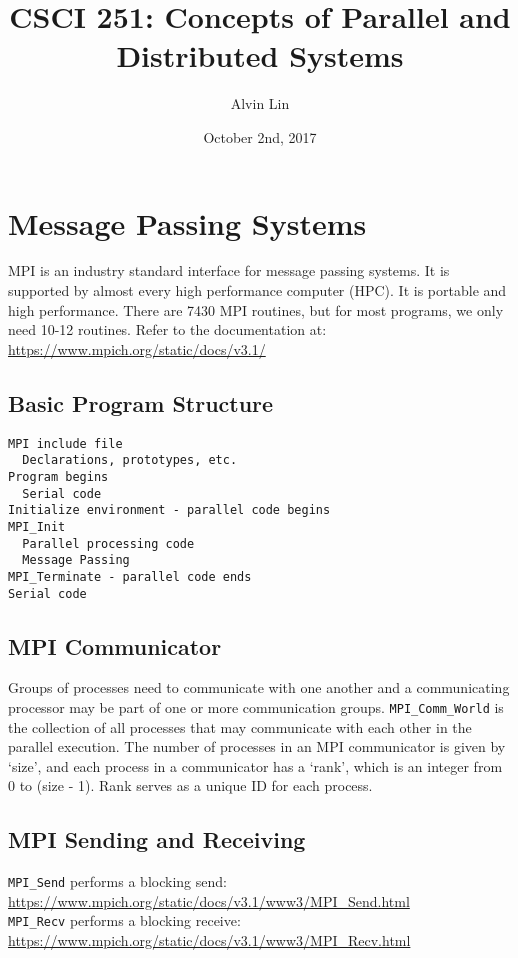 \documentclass[letterpaper, 12pt]{math}
\title{CSCI 251: Concepts of Parallel and Distributed Systems}
\author{Alvin Lin}
\date{October 2nd, 2017}
\begin{document}
\maketitle

\section*{Message Passing Systems}
MPI is an industry standard interface for message passing systems. It is
supported by almost every high performance computer (HPC). It is portable and
high performance. There are 7430 MPI routines, but for most programs, we only
need 10-12 routines. Refer to the documentation at: \\
\url{https://www.mpich.org/static/docs/v3.1/}

\subsection*{Basic Program Structure}
\begin{lstlisting}
MPI include file
  Declarations, prototypes, etc.
Program begins
  Serial code
Initialize environment - parallel code begins
MPI_Init
  Parallel processing code
  Message Passing
MPI_Terminate - parallel code ends
Serial code
\end{lstlisting}

\subsection*{MPI Communicator}
Groups of processes need to communicate with one another and a communicating
processor may be part of one or more communication groups.
\texttt{MPI\_Comm\_World} is the collection of all processes that may
communicate with each other in the parallel execution. The number of processes
in an MPI communicator is given by `size', and each process in a communicator
has a `rank', which is an integer from 0 to (size - 1). Rank serves as a
unique ID for each process.

\subsection*{MPI Sending and Receiving}
\texttt{MPI\_Send} performs a blocking send: \\
\url{https://www.mpich.org/static/docs/v3.1/www3/MPI_Send.html} \\
\texttt{MPI\_Recv} performs a blocking receive: \\
\url{https://www.mpich.org/static/docs/v3.1/www3/MPI_Recv.html}
\end{document}
